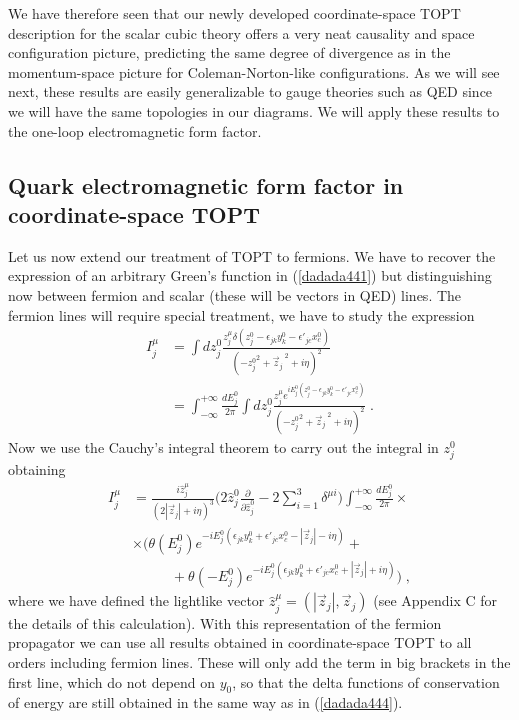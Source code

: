 \documentclass[%
 reprint,
 amsmath,amssymb,
 aps,
]{revtex4-1}
\begin{document}
 We have therefore seen that our newly developed coordinate-space TOPT description for the scalar cubic theory offers a very neat causality and space configuration picture, predicting the same degree of divergence as in the momentum-space picture for Coleman-Norton-like configurations. As we will see next, these results are easily generalizable to gauge theories such as QED since we will have the same topologies in our diagrams. We will apply these results to the one-loop electromagnetic form factor.
 
 \subsection{Quark electromagnetic form factor in coordinate-space TOPT}
 Let us now extend our treatment of TOPT to fermions. We have to recover the expression of an arbitrary Green's function in (\ref{dadada441}) but distinguishing now between fermion and scalar (these will be vectors in QED) lines. The fermion lines will require special treatment, we have to study the expression
 \begin{align}
 I^\mu_j&=\int dz^0_{j}\frac{z_j^\mu\delta(z_{j}^0-\epsilon_{jk}y_k^0-\epsilon'_{jc}x^0_c)}{(-{z_{j}^0}^2+{\vec{z}_j}^{\;2}+i\eta)^2}\nonumber\\
 &=\int_{-\infty}^{+\infty}\frac{dE^0_j}{2\pi}\int dz^0_{j}\frac{z_j^\mu e^{iE^0_j(z_{j}^0-\epsilon_{jk}y^0_k-\epsilon'_{jc}x^0_c)}}{(-{z_{j}^0}^2+{\vec{z}_j}^{\;2}+i\eta)^2}\;.
\end{align}
Now we use the Cauchy's integral theorem to carry out the integral in $z_j^0$ obtaining
 \begin{align}
 I^\mu_j&=\frac{i\hat{z}_j^\mu}{(2|\vec{z}_j|+i\eta)^3}\Big(2\hat{z}_j^0\frac{\partial}{\partial \hat{z}_j^0}-2\sum_{i=1}^3\delta^{\mu i}\Big)\int_{-\infty}^{+\infty}\frac{dE^0_j}{2\pi}\nonumber\times\\
& \times \Big(\theta (E^0_j)e^{-iE_j^0(\epsilon_{jk}y^0_k+\epsilon'_{jc}x^0_c-|\vec{z}_j|-i\eta)}+\nonumber\\
&\;\;\;\;\;\;\;\;\;\;+\theta (-E^0_j)e^{-iE_j^0(\epsilon_{jk}y^0_k+\epsilon'_{jc}x^0_c+|\vec{z}_j|+i\eta)}\Big) \;,
\end{align}
where we have defined the lightlike vector $\hat{z}_j^\mu=(|\vec{z}_j|,\vec{z}_j)$ (see Appendix C for the details of this calculation). With this representation of the fermion propagator we can use all results obtained in coordinate-space TOPT to all orders including fermion lines. These will only add the term in big brackets in the first line, which do not depend on $y_0$, so that the delta functions of conservation of energy are still obtained in the same way as in (\ref{dadada444}).\par
\end{document}

